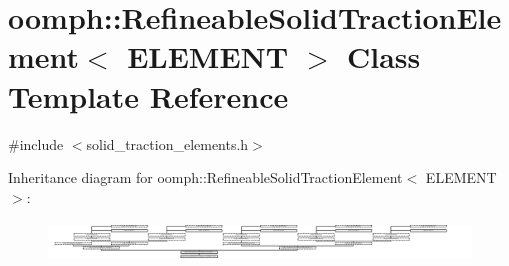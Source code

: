 \hypertarget{classoomph_1_1RefineableSolidTractionElement}{}\section{oomph\+:\+:Refineable\+Solid\+Traction\+Element$<$ E\+L\+E\+M\+E\+NT $>$ Class Template Reference}
\label{classoomph_1_1RefineableSolidTractionElement}


{\ttfamily \#include $<$solid\+\_\+traction\+\_\+elements.\+h$>$}

Inheritance diagram for oomph\+:\+:Refineable\+Solid\+Traction\+Element$<$ E\+L\+E\+M\+E\+NT $>$\+:\begin{figure}[H]
\begin{center}
\leavevmode
\includegraphics[height=1.088965cm]{classoomph_1_1RefineableSolidTractionElement}
\end{center}
\end{figure}
